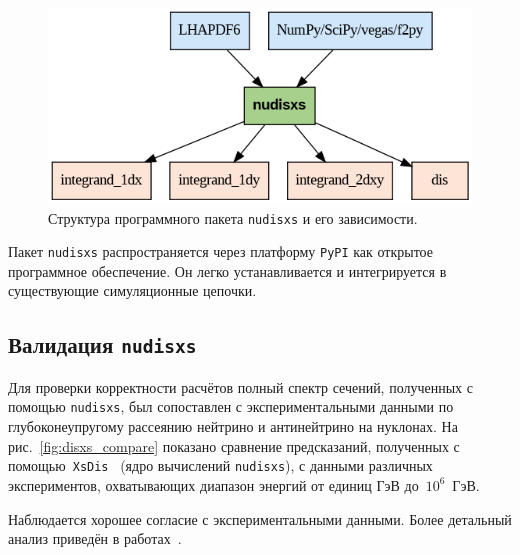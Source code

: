 \begin{figure}[!h]
\centering
\includegraphics[width=\linewidth]{images/nudisxs_diagram.png}
\caption{Структура программного пакета \texttt{nudisxs} и его зависимости.}
\label{fig:nudisxs1}
\end{figure}

Пакет \texttt{nudisxs} распространяется через платформу \texttt{PyPI} как открытое программное обеспечение. 
Он легко устанавливается и интегрируется в существующие симуляционные цепочки. 

\subsection{Валидация \texttt{nudisxs}}

Для проверки корректности расчётов полный спектр сечений, полученных с помощью \texttt{nudisxs}, был сопоставлен с экспериментальными данными по глубоконеупругому рассеянию нейтрино и антинейтрино на нуклонах. 
На рис.~\ref{fig:disxs_compare} показано сравнение предсказаний, полученных с помощью~\texttt{XsDis}~\cite{kuzmin2006_finetuning,kuzmin2005_sumcc,kuzmin2006_axialmass} (ядро вычислений \texttt{nudisxs}), с данными различных экспериментов, охватывающих диапазон энергий от единиц ГэВ до~$10^6$~ГэВ.

Наблюдается хорошее согласие с экспериментальными данными. Более детальный анализ приведён в работах~\cite{kuzmin2006_finetuning,kuzmin2005_sumcc,kuzmin2006_axialmass}.

